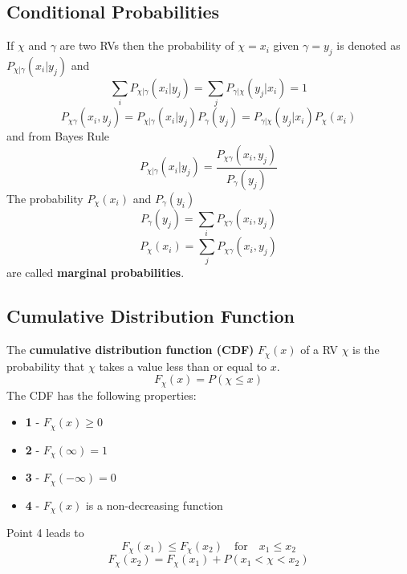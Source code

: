 \documentclass{article}
\begin{document}
    \subsection{Conditional Probabilities}
    If $\chi$ and $\gamma$ are two RVs then the probability of $\chi = x_i$ given $\gamma = y_j$ is denoted 
    as $P_{\chi|\gamma}(x_i|y_j)$ and
    \begin{equation}
        \sum_iP_{\chi|\gamma}(x_i|y_j) = \sum_jP_{\gamma|\chi}(y_j|x_i) = 1
    \end{equation}
    \begin{equation}
        P_{\chi\gamma}(x_i, y_j) = P_{\chi|\gamma}(x_i|y_j)P_{\gamma}(y_j) = P_{\gamma|\chi}(y_j|x_i)P_{\chi}(x_i)
    \end{equation}
    and from Bayes Rule
    \begin{equation}
        P_{\chi|\gamma}(x_i|y_j) = \frac{P_{\chi\gamma}(x_i, y_j)}{P_{\gamma}(y_j)}
    \end{equation}
    The probability $P_{\chi}(x_i)$ and $P_{\gamma}(y_i)$
    \begin{equation}
        P_{\gamma}(y_j) = \sum_iP_{\chi\gamma}(x_i, y_j)
    \end{equation}
    \begin{equation}
        P_{\chi}(x_i) = \sum_jP_{\chi\gamma}(x_i, y_j)
    \end{equation}
    are called \textbf{marginal probabilities}. 

    \subsection{Cumulative Distribution Function}
    The \textbf{cumulative distribution function (CDF)} $F_{\chi}(x)$ of a RV $\chi$ is the probability that
    $\chi$ takes a value less than or equal to $x$.
    \begin{equation}
        F_{\chi}(x) = P(\chi \le x)
    \end{equation}
    The CDF has the following properties:
    \begin{itemize}
        \item \textbf{1}    - $F_{\chi}(x) \ge 0$
        \item \textbf{2}    - $F_{\chi}(\infty) = 1$
        \item \textbf{3}    - $F_{\chi}(-\infty) = 0$
        \item \textbf{4}    - $F_{\chi}(x)$ is a non-decreasing function
    \end{itemize}
    Point 4 leads to 
    \begin{equation}
        F_{\chi}(x_1) \le F_{\chi}(x_2) \quad \textrm{for} \quad x_1 \le x_2
    \end{equation}
    \begin{equation}
        F_{\chi}(x_2) = F_{\chi}(x_1) + P(x_1 < \chi < x_2)
    \end{equation}
\end{document}

